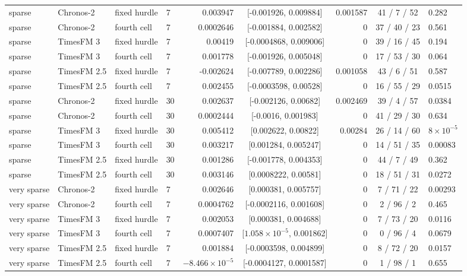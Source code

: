 \begin{table}[htbp]
\begin{tabular}{llllrcrcl}
sparse & Chronos-2 & fixed hurdle & 7 & 0.003947 & [-0.001926, 0.009884] & 0.001587 & 41 / 7 / 52 & 0.282 \\
sparse & Chronos-2 & fourth cell & 7 & 0.0002646 & [-0.001884, 0.002582] & 0 & 37 / 40 / 23 & 0.561 \\
sparse & TimesFM 3 & fixed hurdle & 7 & 0.00419 & [-0.0004868, 0.009006] & 0 & 39 / 16 / 45 & 0.194 \\
sparse & TimesFM 3 & fourth cell & 7 & 0.001778 & [-0.001926, 0.005048] & 0 & 17 / 53 / 30 & 0.064 \\
sparse & TimesFM 2.5 & fixed hurdle & 7 & -0.002624 & [-0.007789, 0.002286] & 0.001058 & 43 / 6 / 51 & 0.587 \\
sparse & TimesFM 2.5 & fourth cell & 7 & 0.002455 & [-0.0003598, 0.00528] & 0 & 16 / 55 / 29 & 0.0515 \\
sparse & Chronos-2 & fixed hurdle & 30 & 0.002637 & [-0.002126, 0.00682] & 0.002469 & 39 / 4 / 57 & 0.0384 \\
sparse & Chronos-2 & fourth cell & 30 & 0.0002444 & [-0.0016, 0.001983] & 0 & 41 / 29 / 30 & 0.634 \\
sparse & TimesFM 3 & fixed hurdle & 30 & 0.005412 & [0.002622, 0.00822] & 0.00284 & 26 / 14 / 60 & $8 \times 10^{-5}$ \\
sparse & TimesFM 3 & fourth cell & 30 & 0.003217 & [0.001284, 0.005247] & 0 & 14 / 51 / 35 & 0.00083 \\
sparse & TimesFM 2.5 & fixed hurdle & 30 & 0.001286 & [-0.001778, 0.004353] & 0 & 44 / 7 / 49 & 0.362 \\
sparse & TimesFM 2.5 & fourth cell & 30 & 0.003146 & [0.0008222, 0.00581] & 0 & 18 / 51 / 31 & 0.0272 \\
very sparse & Chronos-2 & fixed hurdle & 7 & 0.002646 & [0.000381, 0.005757] & 0 & 7 / 71 / 22 & 0.00293 \\
very sparse & Chronos-2 & fourth cell & 7 & 0.0004762 & [-0.0002116, 0.001608] & 0 & 2 / 96 / 2 & 0.465 \\
very sparse & TimesFM 3 & fixed hurdle & 7 & 0.002053 & [0.000381, 0.004688] & 0 & 7 / 73 / 20 & 0.0116 \\
very sparse & TimesFM 3 & fourth cell & 7 & 0.0007407 & [$1.058 \times 10^{-5}$, 0.001862] & 0 & 0 / 96 / 4 & 0.0679 \\
very sparse & TimesFM 2.5 & fixed hurdle & 7 & 0.001884 & [-0.0003598, 0.004899] & 0 & 8 / 72 / 20 & 0.0157 \\
very sparse & TimesFM 2.5 & fourth cell & 7 & $-8.466 \times 10^{-5}$ & [-0.0004127, 0.0001587] & 0 & 1 / 98 / 1 & 0.655 \\

\end{tabular}
\end{table}
